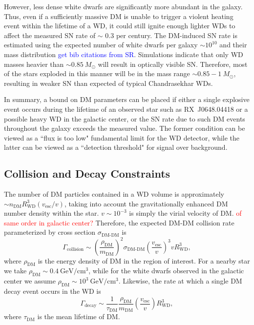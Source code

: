 \documentclass[twocolumn,showpacs,preprintnumbers,amsmath,amssymb,prd]{revtex4}
\newcommand{\GeV}{\text{GeV}}
\def\r{\right)}
\def\l{\left(}
\begin{document}
However, less dense white dwarfs are significantly more abundant in the galaxy.
Thus, even if a sufficiently massive DM is unable to trigger a violent heating event within the lifetime of a WD, it could still ignite enough lighter WDs to affect the measured SN rate of $\sim $ 0.3 per century.
The DM-induced SN rate is estimated using the expected number of white dwarfs per galaxy $\sim 10^{10}$ and their mass distribution \textcolor{blue}{get bib citations from SR}.
Simulations indicate that only WD masses heavier than $\sim 0.85 ~M_{\odot}$ will result in optically visible SN.
Therefore, most of the stars exploded in this manner will be in the mass range $\sim 0.85 - 1 ~M_{\odot}$, resulting in weaker SN than expected of typical Chandrasekhar WDs.


In summary, a bound on DM parameters can be placed if either a single explosive event occurs during the lifetime of an observed star such as RX~J0648.04418 or a possible heavy WD in the galactic center, or the SN rate due to such DM events throughout the galaxy exceeds the measured value.
The former condition can be viewed as a ``flux is too low" fundamental limit for the WD detector, while the latter can be viewed as a ``detection threshold" for signal over background.


\subsection{Collision and Decay Constraints}
\label{sec:CollisionConstraints}
The number of DM particles contained in a WD volume is approximately $\sim n_\text{DM} R_\text{WD}^3 (v_\text{esc}/v)$, taking into account the gravitationally enhanced DM number density within the star.
$v \sim 10^{-3}$ is simply the virial velocity of DM.
\textcolor{red}{of same order in galactic center?} Therefore, the expected DM-DM collision rate parameterized by cross section $\sigma_\text{DM-DM}$ is 
\begin{equation}
\Gamma_\text{collision} \sim \l \frac{\rho_{\text{DM}}}{m_\text{DM}} \r^2 \sigma_\text{DM-DM} \l \frac{v_\text{esc}}{v}\r^3 v R_\text{WD}^3,
\label{eq:collisiongamma}
\end{equation}
where $\rho_{\text{DM}}$ is the energy density of DM in the region of interest.
For a nearby star we take $\rho_\text{DM} \sim 0.4 ~\GeV/\text{cm}^3$, while for the white dwarfs observed in the galactic center we assume $\rho_\text{DM} \sim 10^3 ~\text{GeV}/\text{cm}^3$.
Likewise, the rate at which a single DM decay event occurs in the WD is
\begin{equation}
\Gamma_\text{decay} \sim  \frac{1}{\tau_\text{DM}} \frac{\rho_{\text{DM}}}{m_\text{DM}} \l \frac{v_\text{esc}}{v} \r R_\text{WD}^3,
\label{eq:taugamma}
\end{equation}
where $\tau_\text{DM}$ is the mean lifetime of DM.
\end{document}
